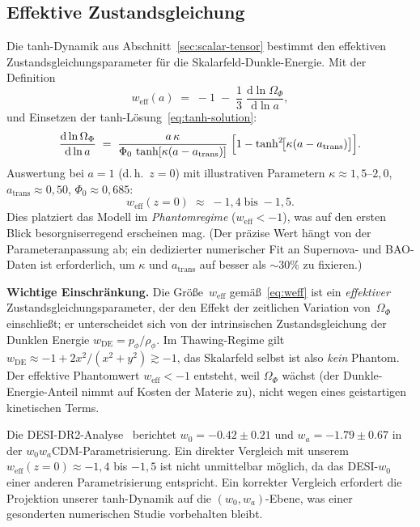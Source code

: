 \documentclass[12pt,a4paper]{article}
\theoremstyle{definition}
\theoremstyle{plain}
\theoremstyle{remark}
\newcommand{\dd}{\mathrm{d}}
\begin{document}
\subsection{Effektive Zustandsgleichung}\label{sec:weff}

Die tanh-Dynamik aus Abschnitt~\ref{sec:scalar-tensor} bestimmt den
effektiven Zustandsgleichungsparameter f\"ur die Skalarfeld-Dunkle-Energie.
Mit der Definition
\begin{equation}\label{eq:weff}
  w_{\mathrm{eff}}(a)
  \;=\; -1 \;-\; \frac{1}{3}\;
  \frac{\dd\ln\Omega_{\Phi}}{\dd\ln a},
\end{equation}
und Einsetzen der tanh-L\"osung~\eqref{eq:tanh-solution}:
\begin{equation}
  \frac{\dd\ln\Omega_{\Phi}}{\dd\ln a}
  \;=\; \frac{a\,\kappa}
       {\Phi_{0}\,\tanh[\kappa(a - a_{\mathrm{trans}})]}\;
  \Bigl[1 - \tanh^{2}\!\bigl[\kappa(a - a_{\mathrm{trans}})\bigr]
  \Bigr].
\end{equation}
Auswertung bei $a = 1$ (d.\,h.\ $z = 0$) mit illustrativen Parametern
$\kappa \approx 1{,}5$--$2{,}0$, $a_{\mathrm{trans}} \approx 0{,}50$,
$\Phi_{0} \approx 0{,}685$:
\begin{equation}\label{eq:w0-prediction}
  w_{\mathrm{eff}}(z=0) \;\approx\; -1{,}4 \;\text{bis}\; -1{,}5.
\end{equation}
Dies platziert das Modell im \emph{Phantomregime}
($w_{\mathrm{eff}} < -1$), was auf den ersten Blick besorgniserregend
erscheinen mag.
(Der pr\"azise Wert h\"angt von der Parameteranpassung ab; ein
dedizierter numerischer Fit an Supernova- und BAO-Daten ist
erforderlich, um $\kappa$ und $a_{\mathrm{trans}}$ auf besser als
$\sim 30\%$ zu fixieren.)

\medskip\noindent
\textbf{Wichtige Einschr\"ankung.}\;
Die Gr\"o\ss e~$w_{\mathrm{eff}}$ gem\"a\ss~\eqref{eq:weff} ist ein
\emph{effektiver} Zustandsgleichungsparameter, der den Effekt der
zeitlichen Variation von~$\Omega_{\Phi}$ einschlie\ss t; er unterscheidet
sich von der intrinsischen Zustandsgleichung der Dunklen Energie
$w_{\mathrm{DE}} = p_{\phi}/\rho_{\phi}$. Im Thawing-Regime gilt
$w_{\mathrm{DE}} \approx -1 + 2x^{2}/(x^{2}+y^{2}) \gtrsim -1$,
das Skalarfeld selbst ist also \emph{kein} Phantom.
Der effektive Phantomwert $w_{\mathrm{eff}} < -1$ entsteht, weil
$\Omega_{\Phi}$ w\"achst (der Dunkle-Energie-Anteil nimmt auf Kosten
der Materie zu), nicht wegen eines geistartigen kinetischen Terms.

Die DESI-DR2-Analyse~\cite{DESI2025} berichtet
$w_{0} = -0.42 \pm 0.21$ und $w_{a} = -1.79 \pm 0.67$ in der
$w_{0}w_{a}$CDM-Parametrisierung. Ein direkter Vergleich mit unserem
$w_{\mathrm{eff}}(z=0) \approx -1{,}4$ bis $-1{,}5$ ist nicht unmittelbar m\"oglich,
da das DESI-$w_{0}$ einer anderen Parametrisierung entspricht.
Ein korrekter Vergleich erfordert die Projektion unserer tanh-Dynamik
auf die $(w_{0}, w_{a})$-Ebene, was einer gesonderten numerischen
Studie vorbehalten bleibt.
\end{document}
